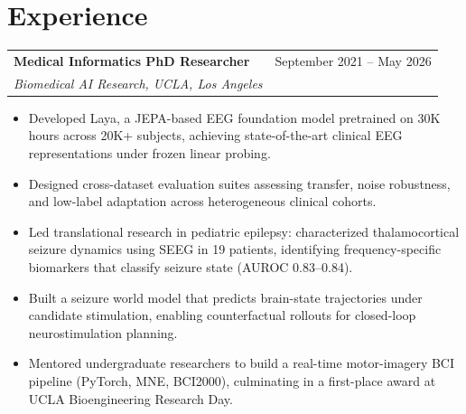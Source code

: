 
\newenvironment{jobshort}[4]{%
  \begin{tabularx}{\linewidth}{@{}X r@{}}
    \textbf{#1} & #4 \\[-1pt]
    \textit{#2, #3} & \\[3pt]
  \end{tabularx}
}{}

\newenvironment{joblong}[4]{%
  \begin{tabularx}{\linewidth}{@{}X r@{}}
    \textbf{#1} & #4 \\[-1pt]
    \textit{#2, #3} & \\[3pt]
  \end{tabularx}
  \begin{itemize}[leftmargin=1em, label=--,topsep=2pt, partopsep=3pt, parsep=0pt, itemsep=2pt]
}{%
  \end{itemize}
  \vspace{0.6em} %
}


\section*{Experience}

\begin{joblong}{Medical Informatics PhD Researcher}{Biomedical AI Research, UCLA}{Los Angeles}{September 2021 -- May 2026}
    \item Developed Laya, a JEPA-based EEG foundation model pretrained on 30K hours across 20K+ subjects, achieving state-of-the-art clinical EEG representations under frozen linear probing.
    \item Designed cross-dataset evaluation suites assessing transfer, noise robustness, and low-label adaptation across heterogeneous clinical cohorts.
    \item Led translational research in pediatric epilepsy: characterized thalamocortical seizure dynamics using SEEG in 19 patients, identifying frequency-specific biomarkers that classify seizure state (AUROC 0.83--0.84).
    \item Built a seizure world model that predicts brain-state trajectories under candidate stimulation, enabling counterfactual rollouts for closed-loop neurostimulation planning.
    \item Mentored undergraduate researchers to build a real-time motor-imagery BCI pipeline (PyTorch, MNE, BCI2000), culminating in a first-place award at UCLA Bioengineering Research Day.
\end{joblong}




